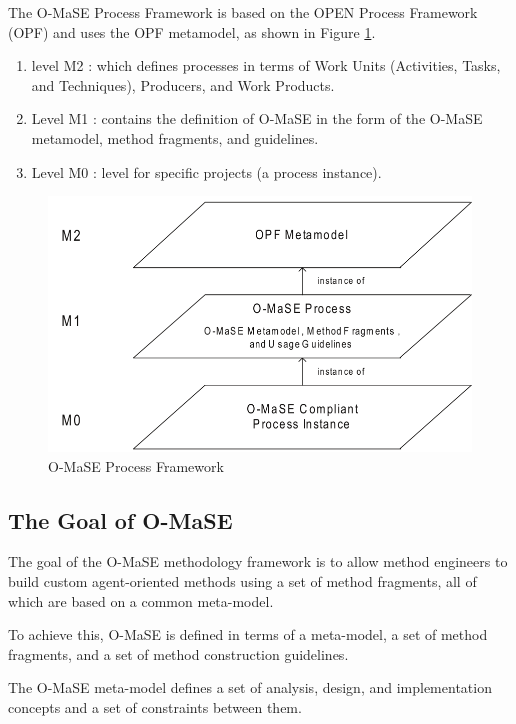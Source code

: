 The O-MaSE Process Framework is based on the OPEN Process Framework (OPF)
and uses the OPF metamodel, as shown in Figure \ref{fig:O-MaSE Process Framework}\cite{omacs4}.

\begin{enumerate}
\item 
	level M2 : which defines processes in terms of Work Units (Activities, Tasks, and Techniques),
	 Producers, and Work Products.
\item
	Level M1 : contains the definition of O-MaSE in the form of the O-MaSE metamodel, method fragments, and guidelines. 
\item
	Level M0  : level for specific projects (a process instance).
\end{enumerate} 

\begin{figure}[th]
	\centering %
		\includegraphics[scale=0.4]{ch1/img/omase}
	\caption{\label{fig:O-MaSE Process Framework}O-MaSE Process Framework \cite{omacs4}}
\end{figure}
\subsection{The Goal of O-MaSE}

The goal of the O-MaSE methodology framework is to allow method engineers to
build custom agent-oriented methods using a set of method fragments, all of which are
based on a common meta-model\cite{omacs7}.

To achieve this, O-MaSE is defined in terms of a meta-model, a set of method fragments, 
and a set of method construction guidelines. 

The O-MaSE meta-model defines a set of analysis, design, and implementation concepts and a
set of constraints between them. 

